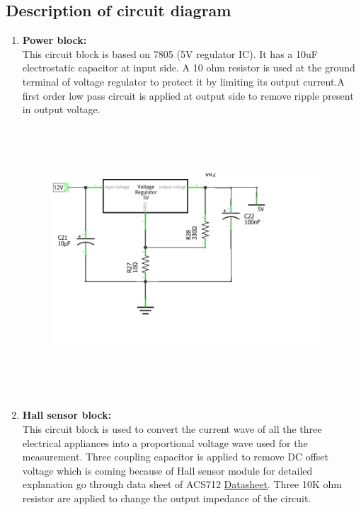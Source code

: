 \documentclass[a4paper,12pt,oneside]{book}
\begin{document}
\begin{appendices}
\section{Description of circuit diagram}
\label{89}
\begin{enumerate}
	\item \textbf{Power block:}\\
	This circuit block is based on 7805 (5V regulator IC). It has a 10uF electrostatic capacitor at input side. A 10 ohm resistor is used at the ground terminal of voltage regulator to protect it by limiting its output current.A first order low pass circuit is applied at output side to remove ripple present in output voltage.
	\begin{figure}[h]
		\includegraphics[width=380px,height=380px]{powerblock}
	\end{figure}
	\item \textbf{Hall sensor block:}\\
	This circuit block is used to convert the current wave of all the three electrical appliances into a proportional voltage wave used for the measurement. Three coupling capacitor is applied to remove DC offset voltage which is coming because of Hall sensor module for detailed explanation go through data sheet of ACS712 \href{./datasheet/ACS712-Datasheet.pdf}{Datasheet}. Three 10K ohm resistor are applied to change the output impedance of the circuit.
	\begin{figure}[h]

\end{figure}
\end{enumerate}
\end{appendices}
\end{document}
